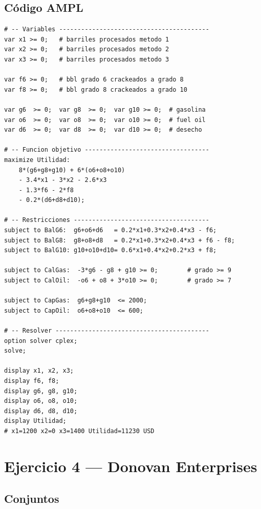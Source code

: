 \documentclass[12pt,a4paper]{article}
\begin{document}
\subsection{Código AMPL}
\begin{lstlisting}[caption={Refinería Melrose -- Modelo AMPL}]
# -- Variables -----------------------------------------
var x1 >= 0;   # barriles procesados metodo 1
var x2 >= 0;   # barriles procesados metodo 2
var x3 >= 0;   # barriles procesados metodo 3

var f6 >= 0;   # bbl grado 6 crackeados a grado 8
var f8 >= 0;   # bbl grado 8 crackeados a grado 10

var g6  >= 0;  var g8  >= 0;  var g10 >= 0;  # gasolina
var o6  >= 0;  var o8  >= 0;  var o10 >= 0;  # fuel oil
var d6  >= 0;  var d8  >= 0;  var d10 >= 0;  # desecho

# -- Funcion objetivo ----------------------------------
maximize Utilidad:
    8*(g6+g8+g10) + 6*(o6+o8+o10)
    - 3.4*x1 - 3*x2 - 2.6*x3
    - 1.3*f6 - 2*f8
    - 0.2*(d6+d8+d10);

# -- Restricciones -------------------------------------
subject to BalG6:  g6+o6+d6   = 0.2*x1+0.3*x2+0.4*x3 - f6;
subject to BalG8:  g8+o8+d8   = 0.2*x1+0.3*x2+0.4*x3 + f6 - f8;
subject to BalG10: g10+o10+d10= 0.6*x1+0.4*x2+0.2*x3 + f8;

subject to CalGas:  -3*g6 - g8 + g10 >= 0;        # grado >= 9
subject to CalOil:  -o6 + o8 + 3*o10 >= 0;        # grado >= 7

subject to CapGas:  g6+g8+g10  <= 2000;
subject to CapOil:  o6+o8+o10  <= 600;

# -- Resolver ------------------------------------------
option solver cplex;
solve;

display x1, x2, x3;
display f6, f8;
display g6, g8, g10;
display o6, o8, o10;
display d6, d8, d10;
display Utilidad;
# x1=1200 x2=0 x3=1400 Utilidad=11230 USD
\end{lstlisting}

\clearpage
\section{Ejercicio 4 — Donovan Enterprises}

\subsection{Conjuntos}
\end{document}
